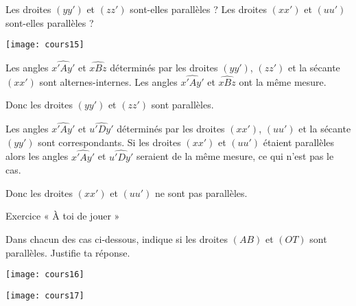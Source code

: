 \begin{exemple*1}
Les droites $(yy')$ et $(zz')$ sont-elles parallèles ? Les droites $(xx')$ et $(uu')$ sont-elles parallèles ?

\begin{center}
    \texttt{[image: cours15]}
\end{center}

\correction
Les angles $\widehat{x'Ay'}$ et $\widehat{xBz}$ déterminés par les droites $(yy')$, $(zz')$ et la sécante $(xx')$ sont alternes-internes. Les angles $\widehat{x'Ay'}$ et $\widehat{xBz}$ ont la même mesure.

Donc les droites $(yy')$ et $(zz')$ sont parallèles.

\vspace{.5em}

Les angles $\widehat{x'Ay'}$ et $\widehat{u'Dy'}$ déterminés par les droites $(xx')$, $(uu')$ et la sécante $(yy')$ sont correspondants. Si les droites $(xx')$ et $(uu')$ étaient parallèles alors les angles $\widehat{x'Ay'}$ et $\widehat{u'Dy'}$ seraient de la même mesure, ce qui n'est pas le cas.

Donc les droites $(xx')$ et $(uu')$ ne sont pas parallèles.
\end{exemple*1}

\vspace{1em}

Exercice « À toi de jouer »

Dans chacun des cas ci-dessous, indique si les droites $(AB)$ et $(OT)$ sont parallèles. Justifie ta réponse.

\begin{center}
\begin{minipage}{.48\linewidth}
\centering
\texttt{[image: cours16]}
\end{minipage}\hfill%
\begin{minipage}{.48\linewidth}
\centering
\texttt{[image: cours17]}
\end{minipage}
\end{center}
